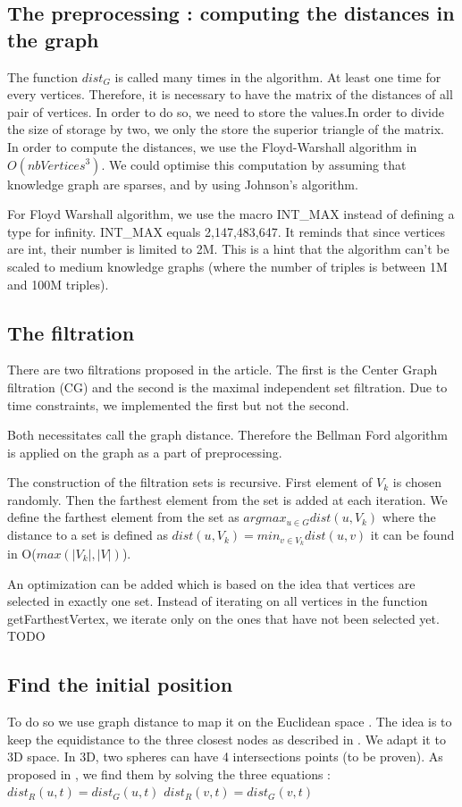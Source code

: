 \documentclass{article}
\begin{document}
\subsection{The preprocessing : computing the distances in the graph}
The function $dist_{G}$ is called many times in the algorithm. At least one time for every vertices. Therefore, it is necessary to have the matrix of the distances of all pair of vertices. In order to do so, we need to store the values.In order to divide the size of storage by two, we only the store the superior triangle of the matrix. 
In order to compute the distances, we use the Floyd-Warshall algorithm in $O(nbVertices^3)$. We could optimise this computation by assuming that knowledge graph are sparses, and by using Johnson's algorithm.  

For Floyd Warshall algorithm, we use the macro INT_MAX instead of defining a type for infinity. INT_MAX equals 2,147,483,647. It reminds that since vertices are int, their number is limited to 2M. This is a hint that the algorithm can't be scaled to medium knowledge graphs (where the number of triples is between 1M and 100M triples). 

\subsection{The filtration}
There are two filtrations proposed in the article. 
The first is the Center Graph filtration (CG) and the second is the maximal independent set filtration.
Due to time constraints, we implemented the first but not the second. 

Both necessitates call the graph distance. Therefore the Bellman Ford algorithm is applied on the graph as a part of preprocessing. 

The construction of the filtration sets is recursive.
First element of $V_{k}$ is chosen randomly. 
Then the farthest element from the set is added at each iteration. 
We define the farthest element from the set as 
$argmax_{u \in G} dist(u, V_{k})$
where the distance to a set is defined as $dist(u, V_{k}) = min_{v \in V_{k}} dist(u, v)$
it can be found in O($ max(|V_{k}|, |V|)$). 

An optimization can be added which is based on the idea that vertices are selected in exactly one set. Instead of iterating on all vertices in the function getFarthestVertex, we iterate only on the ones that have not been selected yet. TODO

\subsection{Find the initial position}
To do so we use graph distance to map it on the Euclidean space . The idea is to keep the equidistance to the three closest nodes as described in \cite{gajer00}. 
We adapt it to 3D space. 
In 3D, two spheres can have 4 intersections points (to be proven).
As proposed in \cite{gajer00},  we find them by solving the three equations : 
$dist_{R}(u, t) = dist_{G}(u, t)$
$dist_{R}(v, t) = dist_{G}(v, t)$
\end{document}
